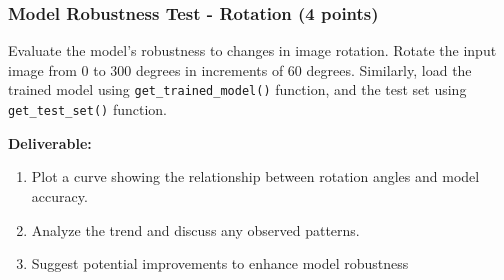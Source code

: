 \documentclass[11pt, oneside]{article}   	%
\begin{document}
\subsubsection*{Model Robustness Test - Rotation (4 points)}

Evaluate the model's robustness to changes in image rotation. Rotate the input image from $0$ to $300$ degrees in increments of $60$ degrees. 
Similarly, load the trained model using \texttt{get\_trained\_model()} function, and the test set using \texttt{get\_test\_set()} function. 

\noindent\textbf{Deliverable:}

\begin{enumerate}
    \item Plot a curve showing the relationship between rotation angles and model accuracy.
    \item Analyze the trend and discuss any observed patterns.
    \item Suggest potential improvements to enhance model robustness
\end{enumerate}
\end{document}
